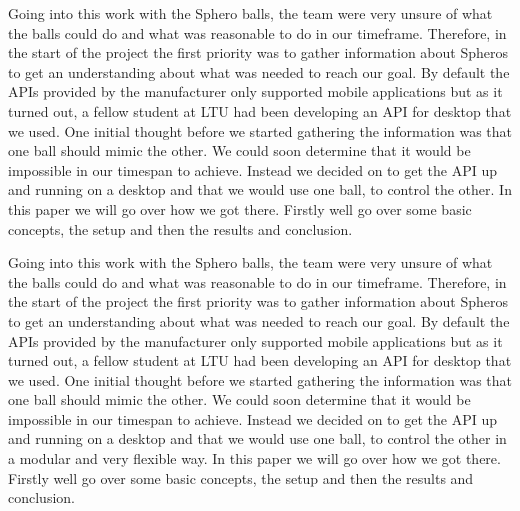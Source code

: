 
Going into this work with the Sphero balls, the team were very unsure of what the balls could do and what was reasonable to do in our timeframe. Therefore, in the start of the project the first priority was to gather information about Spheros to get an understanding about what was needed to reach our goal. By default the APIs provided by the manufacturer only supported mobile applications but as it turned out, a fellow student at LTU had been developing an API for desktop\cite{nicklasgavelin} that we used. One initial thought before we started gathering the information was that one ball should mimic the other. We could soon determine that it would be impossible in our timespan to achieve. Instead we decided on to get the API up and running on a desktop and that we would use one ball, to control the other. In this paper we will go over how we got there. Firstly well go over some basic concepts, the setup and then the results and conclusion.\bigskip

Going into this work with the Sphero balls, the team were very unsure of what the balls could do and what was reasonable to do in our timeframe. Therefore, in the start of the project the first priority was to gather information about Spheros to get an understanding about what was needed to reach our goal. By default the APIs provided by the manufacturer only supported mobile applications but as it turned out, a fellow student at LTU had been developing an API for desktop\cite{nicklasgavelin} that we used. One initial thought before we started gathering the information was that one ball should mimic the other. We could soon determine that it would be impossible in our timespan to achieve. Instead we decided on to get the API up and running on a desktop and that we would use one ball, to control the other in a modular and very flexible way. In this paper we will go over how we got there. Firstly well go over some basic concepts, the setup and then the results and conclusion.

